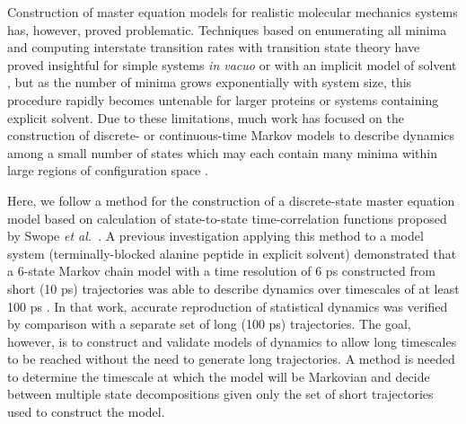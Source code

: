 Construction of master equation models for realistic molecular mechanics systems has, however, proved problematic. 
Techniques based on enumerating all minima and computing interstate transition rates with transition state theory have proved insightful for simple systems \emph{in vacuo} or with an implicit model of solvent \cite{czerminski:1990a,kunz:1995a,ball:1998b,levy:2001a,mortenson:2001a,mortenson:2002a,evans:2004a}, but as the number of minima grows exponentially with system size, this procedure rapidly becomes untenable for larger proteins or systems containing explicit solvent.
Due to these limitations, much work has focused on the construction of discrete- or continuous-time Markov models to describe dynamics among a small number of states which may each contain many minima within large regions of configuration space \cite{grubmueller:1994a,degroot:2001a,swope:2004b,singhal:2004a,levy:2005a,sorin:2005b,sriraman:2005a,schultheis:2005a,singhal:2005a,elmer:2005b,park:2006a}.

Here, we follow a method for the construction of a discrete-state master equation model based on calculation of state-to-state time-correlation functions proposed by Swope \emph{et al.}\ \cite{swope:2004a}.  
A previous investigation applying this method to a model system (terminally-blocked alanine peptide in explicit solvent) demonstrated that a 6-state Markov chain model with a time resolution of 6 ps constructed from short (10 ps) trajectories was able to describe dynamics over timescales of at least 100 ps \cite{chodera:mms:2006}.
In that work, accurate reproduction of statistical dynamics was verified by comparison with a separate set of long (100 ps) trajectories.
The goal, however, is to construct and validate models of dynamics to allow long timescales to be reached without the need to generate long trajectories.
A method is needed to determine the timescale at which the model will be Markovian and decide between multiple state decompositions given only the set of short trajectories used to construct the model.

